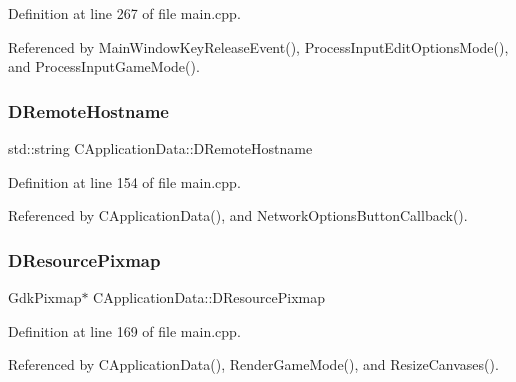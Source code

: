 Definition at line 267 of file main.\+cpp.



Referenced by Main\+Window\+Key\+Release\+Event(), Process\+Input\+Edit\+Options\+Mode(), and Process\+Input\+Game\+Mode().

\hypertarget{classCApplicationData_a09da79011ab5ce6d6108d1c20f0e7c69}{}\label{classCApplicationData_a09da79011ab5ce6d6108d1c20f0e7c69} 
\subsubsection{\texorpdfstring{D\+Remote\+Hostname}{DRemoteHostname}}
{\footnotesize\ttfamily std\+::string C\+Application\+Data\+::\+D\+Remote\+Hostname\hspace{0.3cm}{\ttfamily [protected]}}



Definition at line 154 of file main.\+cpp.



Referenced by C\+Application\+Data(), and Network\+Options\+Button\+Callback().

\hypertarget{classCApplicationData_aa9faf270fb2d769855fa5d787a883a83}{}\label{classCApplicationData_aa9faf270fb2d769855fa5d787a883a83} 
\subsubsection{\texorpdfstring{D\+Resource\+Pixmap}{DResourcePixmap}}
{\footnotesize\ttfamily Gdk\+Pixmap$\ast$ C\+Application\+Data\+::\+D\+Resource\+Pixmap\hspace{0.3cm}{\ttfamily [protected]}}



Definition at line 169 of file main.\+cpp.



Referenced by C\+Application\+Data(), Render\+Game\+Mode(), and Resize\+Canvases().

\hypertarget{classCApplicationData_ac912b3f9b8e9a8c1b49eeadac315284f}{}\label{classCApplicationData_ac912b3f9b8e9a8c1b49eeadac315284f} 
